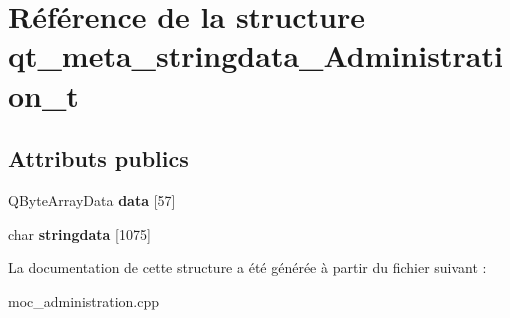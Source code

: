 \hypertarget{structqt__meta__stringdata___administration__t}{\section{Référence de la structure qt\+\_\+meta\+\_\+stringdata\+\_\+\+Administration\+\_\+t}
\label{structqt__meta__stringdata___administration__t}
}
\subsection*{Attributs publics}
\begin{DoxyCompactItemize}
\item 
\hypertarget{structqt__meta__stringdata___administration__t_a4043854211d9257b14b5b19133b1188f}{Q\+Byte\+Array\+Data {\bfseries data} \mbox{[}57\mbox{]}}\label{structqt__meta__stringdata___administration__t_a4043854211d9257b14b5b19133b1188f}

\item 
\hypertarget{structqt__meta__stringdata___administration__t_a4b76ebd7af4e2060e221ffed227989cc}{char {\bfseries stringdata} \mbox{[}1075\mbox{]}}\label{structqt__meta__stringdata___administration__t_a4b76ebd7af4e2060e221ffed227989cc}

\end{DoxyCompactItemize}


La documentation de cette structure a été générée à partir du fichier suivant \+:\begin{DoxyCompactItemize}
\item 
moc\+\_\+administration.\+cpp\end{DoxyCompactItemize}
